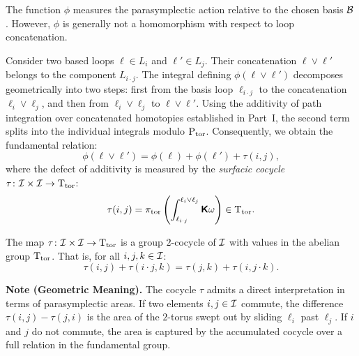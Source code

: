 \documentclass[11pt,reqno,letterpaper,twoside]{amsart}
\begin{document}
  \begin{article}
    \label{art:The Surfacic Cocycle}
    
    The function $\phi$ measures the parasymplectic action relative to the chosen basis $\mathcal{B}$.
    However,
    $\phi$ is generally not a homomorphism with respect to loop concatenation.
    
    Consider two based loops $\ell \in L_i$ and $\ell' \in L_j$.
    Their concatenation $\ell \vee \ell'$ belongs to the component $L_{i \cdot j}$.
    The integral defining $\phi(\ell \vee \ell')$ decomposes geometrically into two steps:
    first from the basis loop $\ell_{i \cdot j}$ to the concatenation $\ell_i \vee \ell_j$,
    and then from $\ell_i \vee \ell_j$ to $\ell \vee \ell'$.
    Using the additivity of path integration over concatenated homotopies established in Part~I,
    the second term splits into the individual integrals modulo $\operatorname{P}_{\mathrm{tor}}$.
    Consequently,
    we obtain the fundamental relation:
    \[
      \phi(\ell \vee \ell') = \phi(\ell) + \phi(\ell') + \tau(i,j),
      \]
    where the defect of additivity is measured by the \emph{surfacic cocycle} $\tau \colon \mathcal{I} \times \mathcal{I} \to \mathrm{T}_{\mathrm{tor}}$:
    \[
      \tau(i,j) = \pi_{\mathrm{tor}} \left( \int_{\ell_{i \cdot j}}^{\ell_i \vee \ell_j} \boldsymbol{\mathsf{K}}\omega \right) \in \mathrm{T}_{\mathrm{tor}}.
      \]
    
    \begin{proposition}
      The map $\tau \colon \mathcal{I} \times \mathcal{I} \to \mathrm{T}_{\mathrm{tor}}$ is a group $2$-cocycle of $\mathcal{I}$ with values in the abelian group $\mathrm{T}_{\mathrm{tor}}$.
      That is,
      for all $i, j, k \in \mathcal{I}$:
      \[
        \tau(i,j) + \tau(i \cdot j, k) = \tau(j,k) + \tau(i, j \cdot k).
        \]
    \end{proposition}
    
    \textbf{Note (Geometric Meaning).}
    The cocycle $\tau$ admits a direct interpretation in terms of parasymplectic areas.
    If two elements $i, j \in \mathcal{I}$ commute,
    the difference $\tau(i,j) - \tau(j,i)$ is the area of the $2$-torus swept out by sliding $\ell_i$ past $\ell_j$.
    If $i$ and $j$ do not commute,
    the area is captured by the accumulated cocycle over a full relation in the fundamental group.
  \end{article}
  
\end{document}
